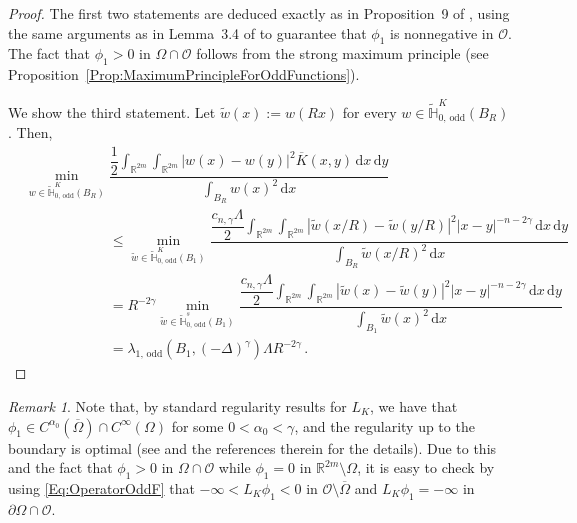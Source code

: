 \documentclass[12pt,reqno]{amsart}
\theoremstyle{definition}
\theoremstyle{remark}
\newtheorem{remark}[theorem]{Remark}
\newcommand{\con}[1]{\mathbb{#1}}
\newcommand{\R}{\con{R}} %
\renewcommand{\H}{\con{H}}
\newcommand{\ocal}{\mathcal{O}}
\newcommand{\s}{\gamma}
\newcommand{\fraclaplacian}{(-\Delta)^\s}
\renewcommand{\d}{\,\mathrm{d}} %
\def\ds{\displaystyle}
\numberwithin{equation}{section}
\begin{document}
\begin{proof}
	The first two statements are deduced exactly as in Proposition~9 of \cite{ServadeiValdinoci}, using the same arguments as in  Lemma~3.4 of \cite{FelipeSanz-Perela:IntegroDifferentialI} to guarantee that $\phi_1$ is nonnegative in $\ocal$. The fact that $\phi_1 > 0$ in $\Omega \cap \ocal$ follows from the strong maximum principle (see Proposition~\ref{Prop:MaximumPrincipleForOddFunctions}).
	
	We show the third statement. Let $\widetilde{w} (x):= w(Rx)$ for every $w\in \widetilde{\H}^K_{0, \, \mathrm{odd}}(B_R)$. Then,
	\begin{align*}
	& \min_{w \in \widetilde{\H}^K_{0, \, \mathrm{odd}}(B_R)} \dfrac{\dfrac{1}{2}  \ds\int_{\R^{2m}} \int_{\R^{2m}} |w(x) - w(y)|^2 \overline{K}(x,y) \d x \d y}{ \ds \int_{B_R} w(x)^2 \d x} \quad \quad \quad \quad \quad \quad \quad \quad \quad \quad \quad \quad\\
	&   \quad \quad \quad \quad \quad \quad \leq \min_{\widetilde{w} \in \widetilde{\H}^K_{0, \, \mathrm{odd}}(B_1)} \dfrac{\dfrac{c_{n, \s}\Lambda}{2}  \ds\int_{\R^{2m}} \int_{\R^{2m}} |\widetilde{w}(x/R) - \widetilde{w}(y/R)|^2 |x - y|^{-n-2 \s}\d x \d y}{ \ds \int_{B_R} \widetilde{w}(x/R)^2 \d x}
	\\
	& \quad \quad \quad \quad \quad \quad = R^{-2 \s }\min_{\widetilde{w} \in \widetilde{\H}^s_{0, \, \mathrm{odd}}(B_1)} \dfrac{\dfrac{c_{n, \s}\Lambda}{2}  \ds\int_{\R^{2m}} \int_{\R^{2m}} |\widetilde{w}(x) - \widetilde{w}(y)|^2 |x - y|^{-n-2 \s}\d x \d y}{ \ds \int_{B_1} \widetilde{w}(x)^2 \d x}
	\\
	& \quad \quad \quad \quad \quad \quad = \lambda_{1, \, \mathrm{odd}}(B_1, \fraclaplacian) \Lambda R^{-2 \s } \,.
	\end{align*}
\end{proof}

\begin{remark}
	\label{Remark:CsRegularityFirstEigenfunction}
	Note that, by standard regularity results for $L_K$, we have that $\phi_1 \in C^{\alpha_0}(\overline{\Omega})\cap C^\infty(\Omega)$ for some $0<\alpha_0<\s$, and the regularity up to the boundary is optimal (see \cite{RosOton-Survey} and the references therein for the details). Due to this and the fact that $\phi_1 >0$ in $\Omega\cap \ocal$ while $\phi_1=0$ in $\R^{2m}\setminus \Omega$, it is easy to check by using \eqref{Eq:OperatorOddF} that $-\infty <L_K \phi_1 < 0$ in $\ocal\setminus \overline{\Omega}$ and $L_K \phi_1 = -\infty$ in $\partial \Omega \cap \ocal$.
\end{remark}
\end{document}
